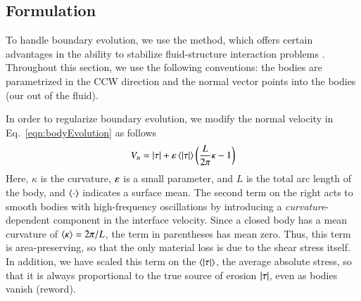 \documentclass[preprint, 10pt]{elsarticle}
\begin{document}
\subsection{{\thL} Formulation} 
\label{sec:thetaL}




To handle boundary evolution, we use the {\thL}    method, which offers
certain advantages in the ability to stabilize fluid-structure
interaction problems \cite{hou-low-she1994}. Throughout this section, we
use the following conventions: the bodies are parametrized in the CCW
direction and the normal vector points into the bodies (our out of the
fluid).

In order to regularize boundary evolution, we modify the normal velocity
in Eq.~\eqref{eqn:bodyEvolution} as follows
\begin{equation}
\label{eqn:Vn}
V_n = \lvert \tau \rvert + \varepsilon \left< \lvert \tau \rvert \right> \left( \frac{L }{2\pi} \kappa - 1 \right)
\end{equation}
Here, $\kappa$ is the curvature, $\varepsilon$ is a small parameter, and $L$ is the total arc length of the body, and $\left< \cdot \right>$ indicates a surface mean. The second term on the right acts to smooth bodies with high-frequency oscillations by introducing a {\em curvature}-dependent component in the interface velocity. Since a closed body has a mean curvature of $\left< \kappa \right> = 2\pi / L$, the term in parentheses has mean zero. Thus, this term is area-preserving, so that the only material loss is due to the shear stress itself. In addition, we have scaled this term on the $\left< \lvert \tau \rvert \right>$, the average absolute stress, so that it is always proportional to the true source of erosion $\lvert \tau \rvert$, even as bodies vanish (reword).
\end{document}
